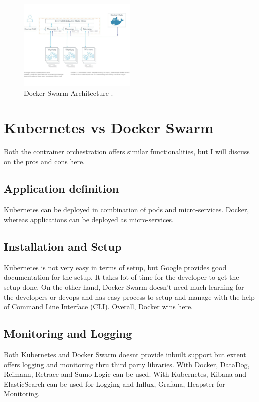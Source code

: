 \documentclass[sigconf]{acmart}
\begin{document}
	\begin{figure}[h]
		\includegraphics[width=0.5\textwidth]{images/DockerSwarm}
		\caption{Docker Swarm Architecture \cite{Platform9}.} \label{fig:figure2} 
	\end{figure}
	
	\section{Kubernetes vs Docker Swarm}
	Both the contrainer orchestration offers similar functionalities, but I will discuss on the pros and cons here.
	\cite{kubernetes-vs-docker-swarm}
	\subsection{Application definition}
	Kubernetes can be deployed in combination of pods and micro-services. Docker, whereas applications can be deployed as micro-services.
	\subsection{Installation and Setup}
	
	Kubernetes is not very easy in terms of setup, but Google provides good documentation for the setup. It takes lot of time for the developer to get the setup done.
	On the other hand, Docker Swarm doesn't need much learning for the developers or devops and has easy process to setup and manage with the help of Command Line Interface (CLI).
	Overall, Docker wins here.
	
	\subsection{Monitoring and Logging}
	Both Kubernetes and Docker Swarm doesnt provide inbuilt support but extent offers logging and monitoring thru third party libraries. 
	With Docker, DataDog, Reimann, Retrace and Sumo Logic can be used.
	With Kubernetes, Kibana and ElasticSearch can be used for Logging and Influx, Grafana, Heapster for Monitoring.
	
\end{document}

